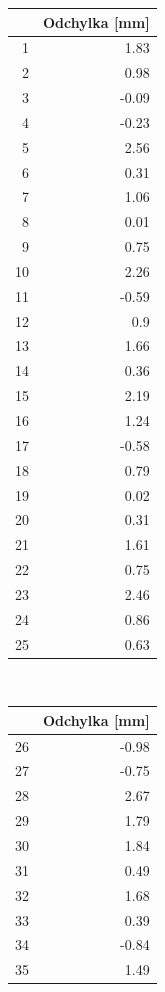 \documentclass[11pt,titlepage]{article}
\begin{document}
\begin{figure}[htbp]\centering\begin{subfigure}[t]{0.5\textwidth}\centering\begin{subfigure}[t]{0.5\textwidth}
\begin{center}
\begin{tabular}{rr}
 & Odchylka [mm]\\
\hline
1 & 1.83\\
2 & 0.98\\
3 & -0.09\\
4 & -0.23\\
5 & 2.56\\
6 & 0.31\\
7 & 1.06\\
8 & 0.01\\
9 & 0.75\\
10 & 2.26\\
11 & -0.59\\
12 & 0.9\\
13 & 1.66\\
14 & 0.36\\
15 & 2.19\\
16 & 1.24\\
17 & -0.58\\
18 & 0.79\\
19 & 0.02\\
20 & 0.31\\
21 & 1.61\\
22 & 0.75\\
23 & 2.46\\
24 & 0.86\\
25 & 0.63\\
\end{tabular}
\end{center}
\end{subfigure}~\begin{subfigure}[t]{0.5\textwidth}
\begin{center}
\begin{tabular}{rr}
 & Odchylka [mm]\\
\hline
26 & -0.98\\
27 & -0.75\\
28 & 2.67\\
29 & 1.79\\
30 & 1.84\\
31 & 0.49\\
32 & 1.68\\
33 & 0.39\\
34 & -0.84\\
35 & 1.49\\

\end{tabular}
\end{center}
\end{subfigure}
\end{subfigure}
\end{figure}
\end{document}
